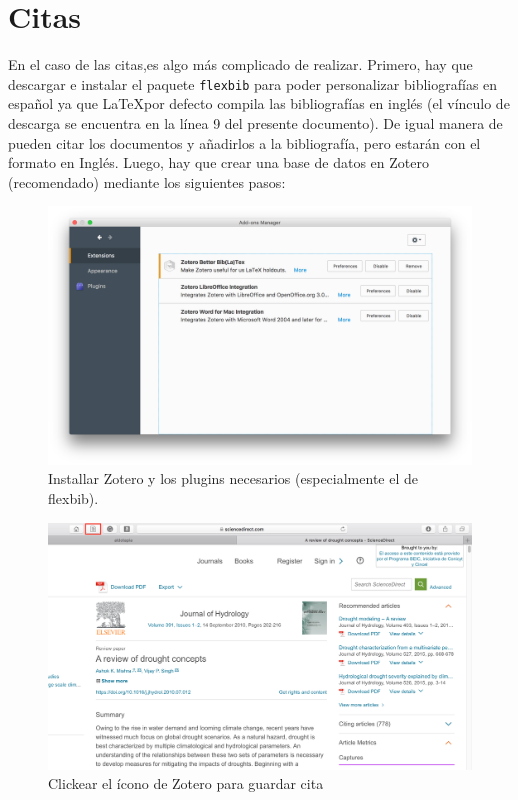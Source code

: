 \documentclass[10pt,]{article}
\begin{document}
\section{Citas\\}

En el caso de las citas,es algo más complicado de realizar. Primero, hay que descargar e instalar el paquete \texttt{flexbib} para poder personalizar bibliografías en español ya que \LaTeX por defecto compila las bibliografías en inglés (el vínculo de descarga se encuentra en la línea 9 del presente documento). De igual manera de pueden citar los documentos y añadirlos a la bibliografía, pero estarán con el formato en Inglés. Luego, hay que crear una base de datos en Zotero (recomendado) mediante los siguientes pasos:\\

\begin{figure}[!h]
\begin{center}
\includegraphics[width=\textwidth]{Figuras/plugins_zotero.png}
\caption{Installar Zotero y los plugins necesarios (especialmente el de flexbib).}
\label{etiqueta_figura1}
\end{center}
\end{figure}

\begin{figure}[!h]
\begin{center}
\includegraphics[width=\textwidth]{Figuras/zotero_web.png}
\caption{Clickear el ícono de Zotero para guardar cita}
\label{etiqueta_figura2}
\end{center}
\end{figure}
\end{document}

